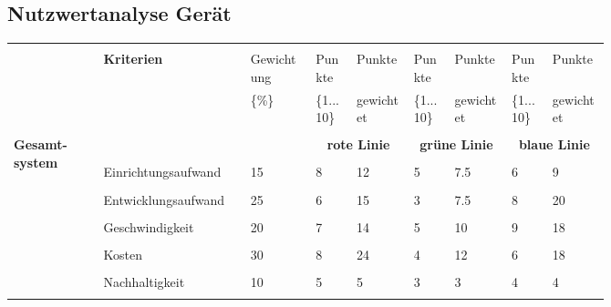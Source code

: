 \documentclass[main.tex]{subfiles} %
\begin{document}
 \begin{landscape} %
 \thispagestyle{fancy}

 \subsection{Nutzwertanalyse Gerät}

     \begin{table}[ht]
        \centering
            \begin{tabular}{|p{0.11\linewidth}|p{0.18\linewidth}|p{0.085\linewidth}|p{0.057\linewidth}|p{0.07\linewidth}|p{0.057\linewidth}|p{0.07\linewidth}|p{0.057\linewidth}|p{0.07\linewidth}|}
            \hline
            &&&&&&&&\\[-9pt]
            & \multirow{2}{*}{\textbf{Kriterien}} & Gewichtung & Punkte & Punkte & Punkte & Punkte & Punkte & Punkte \\[1pt]
            &  & \{\%\} & \{1...10\} & gewichtet & \{1...10\} & gewichtet & \{1...10\} & gewichtet \\[1pt]
            \hline
            \hline
            & \multicolumn{2}{c|}{} & \multicolumn{2}{c|}{} & \multicolumn{2}{c|}{} & \multicolumn{2}{c|}{} \\[-9pt]
            \multirow{7}{4em}{\textbf{Gesamt-system}} & \multicolumn{2}{c|}{} & \multicolumn{2}{c|}{\textbf{rote Linie}} & \multicolumn{2}{c|}{\textbf{grüne Linie}} & \multicolumn{2}{c|}{\textbf{blaue Linie}} \\[1pt]
            \cline{2-9}
            &&&&&&&&\\[-9pt]
            & Einrichtungsaufwand & 15 & 8 & 12 & 5 & 7.5 & 6 & 9 \\[1pt]
            \cline{2-9}
            &&&&&&&&\\[-9pt]
            & Entwicklungsaufwand & 25 & 6 & 15 & 3 & 7.5 & 8 & 20 \\[1pt]
            \cline{2-9}
            &&&&&&&&\\[-9pt]
            & Geschwindigkeit & 20 & 7 & 14 & 5 & 10 & 9 & 18 \\[1pt]
            \cline{2-9}
            &&&&&&&&\\[-9pt]
            & Kosten & 30 & 8 & 24 & 4 & 12 & 6 & 18 \\[1pt]
            \cline{2-9}
            &&&&&&&&\\[-9pt]
            & Nachhaltigkeit & 10 & 5 & 5 & 3 & 3 & 4 & 4 \\[1pt]
            \cline{2-9}
            &&&&&&&&\\[-9pt]

\end{tabular}
\end{table}
\end{landscape}
\end{document}
